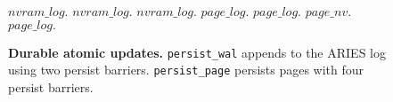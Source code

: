\begin{figure}[]
  \centering
  \caption{\textbf{Durable atomic updates.} \texttt{persist\_wal} appends to the ARIES log using two persist barriers.  \texttt{persist\_page} persists pages with four persist barriers.}
  \label{fig::Code}

  \begin{algorithmic}[1]
      \State $nvram\_log.$
      \State $nvram\_log.$ 
    \EndFor
    \State {}
    \State $nvram\_log.$
    \State {}
  \EndFunction
    \State $page\_log.$
    \State {}
    \State $page\_log.$
    \State {}
    \State $page\_nv.$
    \State {}
    \State $page\_log.$
    \State {}
  \EndFunction
  \end{algorithmic}
\end{figure}
